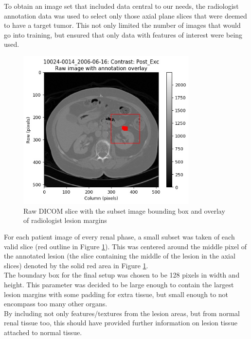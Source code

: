 \documentclass[conference]{IEEEtran}
\begin{document}
To obtain an image set that included data central to our needs, the radiologist annotation data was used to select only those axial plane slices that were deemed to have a target tumor. This not only limited the number of images that would go into training, but ensured that only data with features of interest were being used.\\

%
%
\begin{figure}[h]
\includegraphics[width=9cm]{annotation_10024-0014_2006-06-16_0045}
\caption{Raw DICOM slice with the subset image bounding box and overlay of radiologist lesion margins}
\label{fig:RawSubLesion}
\end{figure}

For each patient image of every renal phase, a small subset was taken of each valid slice (red outline in Figure \ref{fig:RawSubLesion}). This was centered around the middle pixel of the annotated lesion (the slice containing the middle of the lesion in the axial slices) denoted by the solid red area in Figure  \ref{fig:RawSubLesion}. \\
The boundary box for the final setup was chosen to be 128 pixels in width and height. This parameter was decided to be large enough to contain the largest lesion margins with some padding for extra tissue, but small enough to not encompass too many other organs. \\ %
By including not only features/textures from the lesion areas, but from normal renal tissue too, this should have provided further information on lesion tissue attached to normal tissue.
\end{document}
